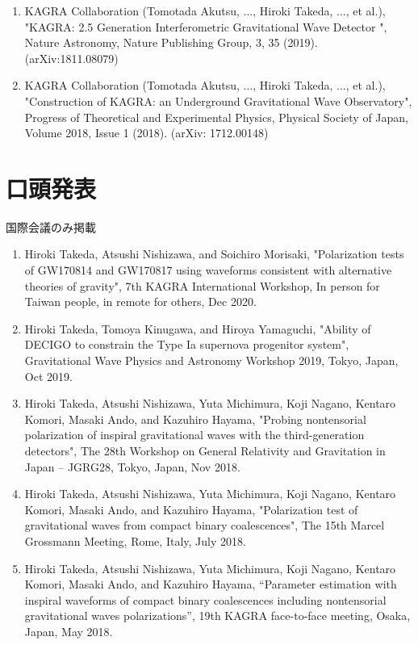 \documentclass[uplatex, 12pt,a4paper]{jsarticle}
\begin{document}
\begin{enumerate}
\item KAGRA Collaboration (Tomotada Akutsu, ..., Hiroki Takeda, ..., et al.), "KAGRA: 2.5 Generation Interferometric Gravitational Wave Detector ", Nature Astronomy, Nature Publishing Group, 3, 35 (2019). (arXiv:1811.08079)

\item KAGRA Collaboration (Tomotada Akutsu, ..., Hiroki Takeda, ..., et al.), "Construction of KAGRA: an Underground Gravitational Wave Observatory", Progress of Theoretical and Experimental Physics, Physical Society of Japan, Volume 2018, Issue 1 (2018). (arXiv: 1712.00148)

\end{enumerate}

\section*{口頭発表}
国際会議のみ掲載
\begin{enumerate}
\item Hiroki Takeda, Atsushi Nishizawa, and Soichiro Morisaki, "Polarization tests of GW170814 and GW170817 using waveforms consistent with alternative theories of gravity", 7th KAGRA International Workshop, In person for Taiwan people, in remote for others, Dec 2020.

\item Hiroki Takeda, Tomoya Kinugawa, and Hiroya Yamaguchi, "Ability of DECIGO to constrain the Type Ia supernova progenitor system", Gravitational Wave Physics and Astronomy Workshop 2019, Tokyo, Japan, Oct 2019.

\item Hiroki Takeda, Atsushi Nishizawa, Yuta Michimura, Koji Nagano, Kentaro Komori, Masaki Ando, and Kazuhiro Hayama, "Probing nontensorial polarization of inspiral gravitational waves with the third-generation detectors", The 28th Workshop on General Relativity and Gravitation in Japan – JGRG28, Tokyo, Japan, Nov 2018.

\item Hiroki Takeda, Atsushi Nishizawa, Yuta Michimura, Koji Nagano, Kentaro Komori, Masaki Ando, and Kazuhiro Hayama, "Polarization test of gravitational waves from compact binary coalescences", The 15th Marcel Grossmann Meeting, Rome, Italy, July 2018.

\item Hiroki Takeda, Atsushi Nishizawa, Yuta Michimura, Koji Nagano, Kentaro Komori, Masaki Ando, and Kazuhiro Hayama, “Parameter estimation with inspiral waveforms of compact binary coalescences including nontensorial gravitational waves polarizations”, 19th KAGRA face-to-face meeting, Osaka, Japan, May 2018.

\end{enumerate}
\end{document}
